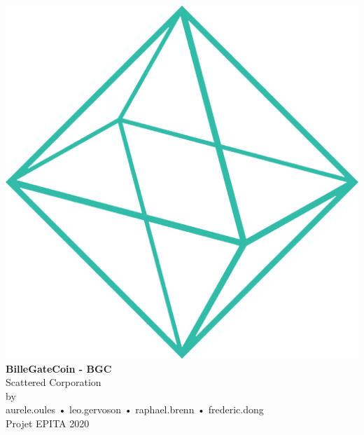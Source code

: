 \documentclass{article}
\begin{document}
\makeatletter
    \begin{titlepage}
        \begin{center}
            \includegraphics[width=0.5\linewidth]{assets/shape.png}\\[10ex]
            {\huge \bfseries BilleGateCoin - BGC}\\[2ex] 
            {\LARGE Scattered Corporation}\\[20ex]
            \large{by\\[2ex]aurele.oules  •  leo.gervoson  •  raphael.brenn  •  frederic.dong}\\[16ex] 
            {\large Projet EPITA 2020}
        \end{center}
    \end{titlepage}
\makeatother
\thispagestyle{empty}

\newpage
\begin{center}
\tableofcontents
\end{center}
\newpage
\pagecolor{white}
\sectionfont{\color{greendark}}  %

\fancyhf{}
\renewcommand{\headrulewidth}{0pt}
\renewcommand{\footrulewidth}{1pt}
\newcommand\bold[1]{\textcolor{green}{\bfseries{#1}}}
\newcommand\boldblack[1]{\textcolor{background}{\bfseries{#1}}}
\renewcommand{\footrule}{\hbox to\headwidth{\color{green}\leaders\hrule height \footrulewidth\hfill}}

\rfoot{\thepage}
\pagestyle{fancy}
\renewcommand\seriesdefault{l}
\end{document}
